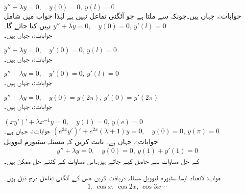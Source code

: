 \quad
$y''+\lambda y=0, \quad y(0)=0,\,y(l)=0$\\
جوابات:،  جہاں  ہیں۔چونکہ  سے  ملتا ہے جو آئگنی تفاعل نہیں ہے لہٰذا  جواب میں شامل نہیں کیا جائے گا۔
\quad
$y''+\lambda y=0, \quad y(0)=0,\,y'(l)=0$\\
جوابات:،  جہاں  ہیں۔

\quad
$y''+\lambda y=0, \quad y'(0)=0,\,y(l)=0$\\
جوابات:،  جہاں  ہیں۔

\quad
$y''+\lambda y=0, \quad y'(0)=0,\,y'(l)=0$\\
جوابات:،  جہاں  ہیں۔

\quad
$y''+\lambda y=0, \quad y(0)=y(2\pi),\,y'(0)=y'(2\pi)$\\
جوابات:،  جہاں  ہیں۔

\quad
$(xy')'+\lambda x^{-1}y=0,\quad y(1)=0,\, y(e)=0$\\
جوابات:،  جہاں  ہے۔
\quad
$(e^{2x}y')'+e^{2x}(\lambda+1)y=0,\quad y(0)=0,\, y(\pi)=0$\\
جوابات:،  جہاں  ہے۔
ثابت کریں کہ مسئلہ سٹیورم لیوویل
\begin{align*}
y''+\lambda y=0, \quad y(0)=0,\, y(1)+y'(1)=0
\end{align*} 
کے حل مساوات  سے حاصل کیے جاتے ہیں۔اس مساوات کے کتنے حل ممکن ہیں۔

جواب: لاتعداد
ایسا سٹیورم لیوویل مسئلہ دریافت کریں جس کے آئگنی تفاعل درج ذیل ہوں۔
\begin{align*}
1,\, \cos x,\, \cos 2x,\, \cos 3x\, \cdots
\end{align*}

